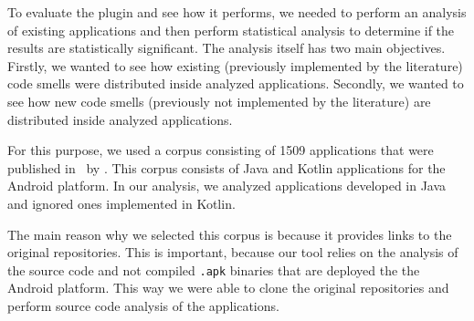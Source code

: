 
To evaluate the plugin and see how it performs, we needed to perform an analysis of existing applications and then
perform statistical analysis to determine if the results are statistically significant.
The analysis itself has two main objectives.
Firstly, we wanted to see how existing (previously implemented by the literature) code smells were distributed
inside analyzed applications.
Secondly, we wanted to see how new code smells (previously not implemented by the literature) are distributed
inside analyzed applications.


For this purpose, we used a corpus consisting of 1509 applications that were published in~\cite{kotlin_android_corpus} by
\citeauthor{kotlin_android_corpus}.
This corpus consists of Java and Kotlin applications for the Android platform.
In our analysis, we analyzed applications developed in Java and ignored ones implemented in Kotlin.

The main reason why we selected this corpus is because it provides links to the original repositories.
This is important, because our tool relies on the analysis of the source code and not compiled \verb|.apk| binaries
that are deployed the the Android platform.
This way we were able to clone the original repositories and perform source code analysis of the applications.
